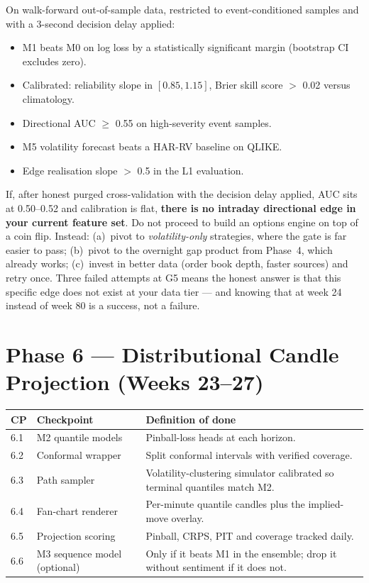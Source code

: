 \begin{gatebox}[title={Gate G5 --- the decision gate of the whole project}]
On walk-forward out-of-sample data, restricted to event-conditioned samples and
with a 3-second decision delay applied:
\begin{itemize}
\item M1 beats M0 on log loss by a statistically significant margin
(bootstrap CI excludes zero).
\item Calibrated: reliability slope in $[0.85, 1.15]$, Brier skill score
$>$ 0.02 versus climatology.
\item Directional AUC $\ge$ 0.55 on high-severity event samples.
\item M5 volatility forecast beats a HAR-RV baseline on QLIKE.
\item Edge realisation slope $>$ 0.5 in the L1 evaluation.
\end{itemize}
\end{gatebox}

\begin{warnbox}[title={Kill criteria for P5 --- read this twice}]
If, after honest purged cross-validation with the decision delay applied, AUC
sits at 0.50--0.52 and calibration is flat, \textbf{there is no intraday
directional edge in your current feature set}. Do not proceed to build an
options engine on top of a coin flip. Instead: (a)~pivot to
\emph{volatility-only} strategies, where the gate is far easier to pass;
(b)~pivot to the overnight gap product from Phase~4, which already works;
(c)~invest in better data (order book depth, faster sources) and retry once.
Three failed attempts at G5 means the honest answer is that this specific edge
does not exist at your data tier --- and knowing that at week 24 instead of week
80 is a success, not a failure.
\end{warnbox}

\section{Phase 6 --- Distributional Candle Projection (Weeks 23--27)}

\begin{longtable}{@{}p{1.4cm}p{6.0cm}p{7.0cm}@{}}
\toprule
\textbf{CP} & \textbf{Checkpoint} & \textbf{Definition of done}\\
\midrule
6.1 & M2 quantile models & Pinball-loss heads at each horizon.\\
6.2 & Conformal wrapper & Split conformal intervals with verified coverage.\\
6.3 & Path sampler & Volatility-clustering simulator calibrated so terminal
quantiles match M2.\\
6.4 & Fan-chart renderer & Per-minute quantile candles plus the implied-move
overlay.\\
6.5 & Projection scoring & Pinball, CRPS, PIT and coverage tracked daily.\\
6.6 & M3 sequence model (optional) & Only if it beats M1 in the ensemble; drop it
without sentiment if it does not.\\
\bottomrule
\end{longtable}

